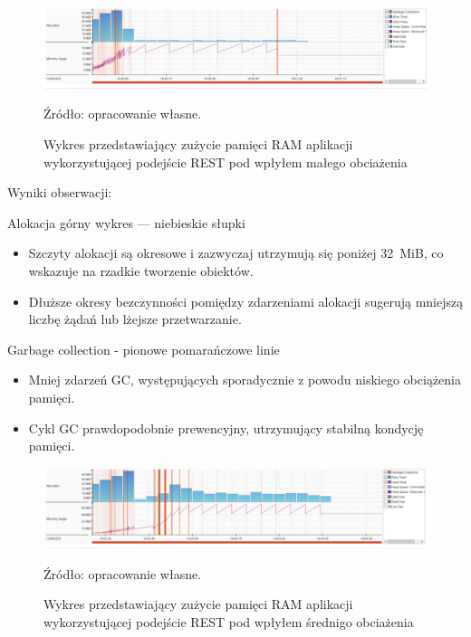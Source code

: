 \documentclass[runningheads,12pt]{llncs}
\begin{document}
\newpage


\begin{figure}
    \includegraphics[width=\linewidth]{images/rest-memory-low-graph.jpg}
    \caption{Wykres przedstawiający zużycie pamięci RAM aplikacji wykorzystującej podejście REST pod wpłyłem małego obciażenia} \label{fig1}
    \vspace{0.5em}
    {\small Źródło: opracowanie własne.}
\end{figure}

Wyniki obserwacji:

Alokacja górny wykres — niebieskie słupki

\begin{itemize}
  \item Szczyty alokacji są okresowe i zazwyczaj utrzymują się poniżej 32~MiB, co wskazuje na rzadkie tworzenie obiektów.
  \item Dłuższe okresy bezczynności pomiędzy zdarzeniami alokacji sugerują mniejszą liczbę żądań lub lżejsze przetwarzanie.
\end{itemize}

Garbage collection - pionowe pomarańczowe linie

\begin{itemize}
  \item Mniej zdarzeń GC, występujących sporadycznie z powodu niskiego obciążenia pamięci.
  \item Cykl GC prawdopodobnie prewencyjny, utrzymujący stabilną kondycję pamięci.
\end{itemize}

\newpage

\begin{figure}
    \includegraphics[width=\linewidth]{images/rest-memory-middle-graph.jpg}
    \caption{Wykres przedstawiający zużycie pamięci RAM aplikacji wykorzystującej podejście REST pod wpłyłem średnigo obciażenia} \label{fig1}
    \vspace{0.5em}
    {\small Źródło: opracowanie własne.}
\end{figure}
\end{document}
